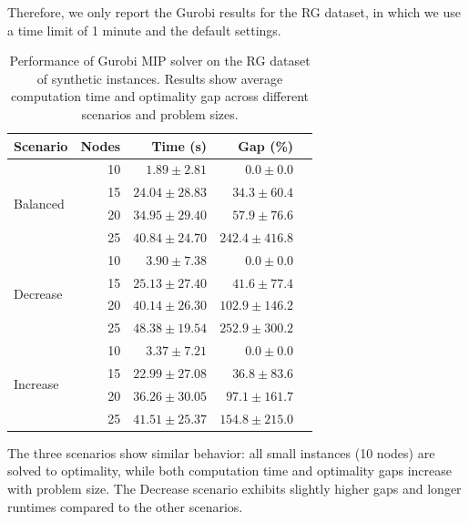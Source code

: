 Therefore, we only report the Gurobi results for the RG dataset, in which we use a time limit of 1 minute and the default settings.

\begin{table}[h]
    \caption{Performance of Gurobi MIP solver on the RG dataset of synthetic instances. Results show average computation time and optimality gap across different scenarios and problem sizes.}
    \label{tab:gurobi_performance}
    \centering
    \begin{tabular}{lrrrr}
        \toprule
        \textbf{Scenario} & \textbf{Nodes} & \textbf{Time (s)} & \textbf{Gap (\%)} \\
        \midrule
        \multirow{4}{*}{Balanced} & 10 & $1.89 \pm 2.81$ & $0.0 \pm 0.0$ \\
        & 15 & $24.04 \pm 28.83$ & $34.3 \pm 60.4$ \\
        & 20 & $34.95 \pm 29.40$ & $57.9 \pm 76.6$ \\
        & 25 & $40.84 \pm 24.70$ & $242.4 \pm 416.8$ \\
        \midrule
        \multirow{4}{*}{Decrease} & 10 & $3.90 \pm 7.38$ & $0.0 \pm 0.0$ \\
        & 15 & $25.13 \pm 27.40$ & $41.6 \pm 77.4$ \\
        & 20 & $40.14 \pm 26.30$ & $102.9 \pm 146.2$ \\
        & 25 & $48.38 \pm 19.54$ & $252.9 \pm 300.2$ \\
        \midrule
        \multirow{4}{*}{Increase} & 10 & $3.37 \pm 7.21$ & $0.0 \pm 0.0$ \\
        & 15 & $22.99 \pm 27.08$ & $36.8 \pm 83.6$ \\
        & 20 & $36.26 \pm 30.05$ & $97.1 \pm 161.7$ \\
        & 25 & $41.51 \pm 25.37$ & $154.8 \pm 215.0$ \\
        \bottomrule
    \end{tabular}
\end{table}

The three scenarios show similar behavior: all small instances (10 nodes) are solved to optimality, while both computation time and optimality gaps increase with problem size.
The Decrease scenario exhibits slightly higher gaps and longer runtimes compared to the other scenarios.

